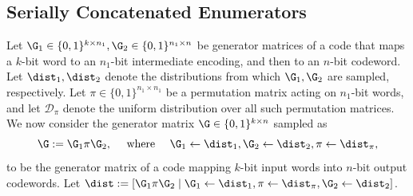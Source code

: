 \subsection{Serially Concatenated Enumerators}\label{ssec:ceenum}

Let $\G_1 \in \{0,1\}^{k \times n_1},\G_2\in \{0,1\}^{n_1 \times n}$ be generator matrices of a code  that maps a $k$-bit word to an $n_1$-bit intermediate encoding, and then to an $n$-bit codeword. Let $\dist_1, \dist_2$ denote the distributions from which $\G_1, \G_2$ are sampled, respectively. 
Let $\pi \in \{0,1\}^{n_1 \times n_1}$ be a permutation matrix acting on $n_1$-bit words, and let $\mathcal{D}_\pi$ denote the uniform distribution over all such permutation matrices.
We now consider the generator matrix $\G \in \{0,1\}^{k \times n}$ sampled as
$$
    \G:=\G_1\pi \G_2, \quad \text{ where }\quad \G_1\gets\dist_1,\G_2\gets\dist_2,\pi\gets\dist_\pi,
$$
to be the generator matrix of a code mapping $k$-bit input words into $n$-bit output codewords. Let $\dist := [ \G_1\pi\G_2 \mid \G_1\gets \dist_1 ,\pi\gets \dist_{\pi},\G_2\gets \dist_2]$. 

